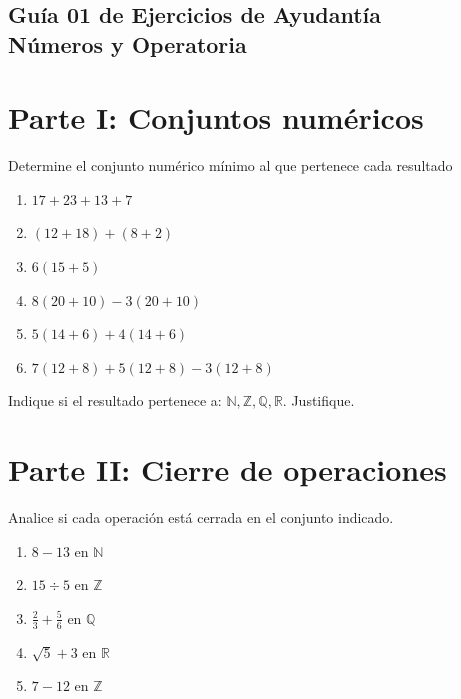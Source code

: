 \documentclass[12pt]{article}
\begin{document}
	
	\vspace*{2em}
	
	\begin{center}
		\section*{\textbf{Guía 01 de Ejercicios de Ayudantía}\\
			\small Números y Operatoria}
	\end{center}
	
	\vspace{1em}
	
	\section*{Parte I: Conjuntos numéricos}
	
	Determine el conjunto numérico mínimo al que pertenece cada resultado
	
	\begin{enumerate}
		\item $17 + 23 + 13 + 7$
		\item $(12 + 18) + (8 + 2)$
		\item $6(15 + 5)$
		\item $8(20 + 10) - 3(20 + 10)$
		\item $5(14 + 6) + 4(14 + 6)$
		\item $7(12 + 8) + 5(12 + 8) - 3(12 + 8)$
	\end{enumerate}
	
	Indique si el resultado pertenece a: $\mathbb{N}, \mathbb{Z}, \mathbb{Q}, \mathbb{R}$. Justifique.
	
	\section*{Parte II: Cierre de operaciones}
	
	Analice si cada operación está cerrada en el conjunto indicado.
	
	\begin{enumerate}
		\item $8 - 13$ en $\mathbb{N}$
		\item $15 \div 5$ en $\mathbb{Z}$
		\item $\frac{2}{3} + \frac{5}{6}$ en $\mathbb{Q}$
		\item $\sqrt{5} + 3$ en $\mathbb{R}$
		\item $7 - 12$ en $\mathbb{Z}$
	\end{enumerate}
	
\end{document}
